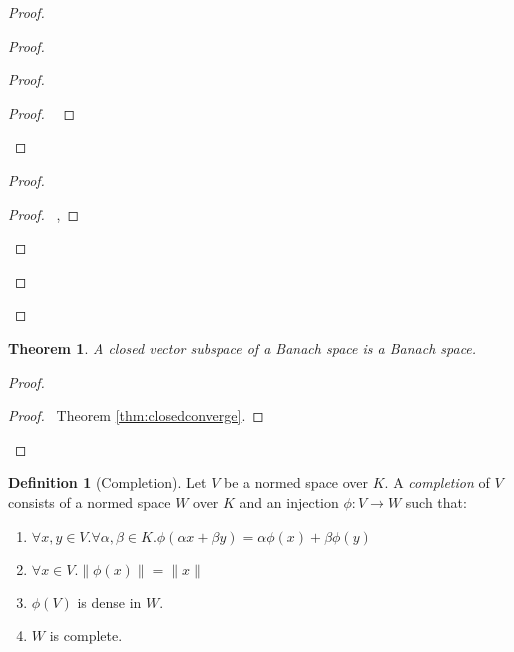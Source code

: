 \documentclass{book}
\let\qed\relax
\newtheorem{thm}[ax]{Theorem}
\theoremstyle{definition}
\newtheorem{df}[ax]{Definition}
\begin{document}
\begin{proof}
\begin{proof}
	\begin{proof}
		\begin{proof}
			\pf\ 
		\end{proof}
	\end{proof}
	\begin{proof}
		\pf
		\begin{proof}
			\pf\ , 
		\end{proof}
	\end{proof}
\end{proof}
\qed
\end{proof}

\begin{thm}
A closed vector subspace of a Banach space is a Banach space.
\end{thm}

\begin{proof}
\pf
{}
\begin{proof}
	\pf\ Theorem \ref{thm:closedconverge}.
\end{proof}
\qed
\end{proof}

\begin{df}[Completion]
Let $V$ be a normed space over $K$. A \emph{completion} of $V$ consists of a normed space $W$ over $K$ and an injection $\phi : V \rightarrow W$ such that:
\begin{enumerate}
\item $\forall x,y \in V. \forall \alpha, \beta \in K. \phi(\alpha x + \beta y) = \alpha \phi(x) + \beta \phi(y)$
\item $\forall x \in V. \|\phi(x)\| = \|x\|$
\item $\phi(V)$ is dense in $W$.
\item $W$ is complete.
\end{enumerate}
\end{df}
\end{document}
